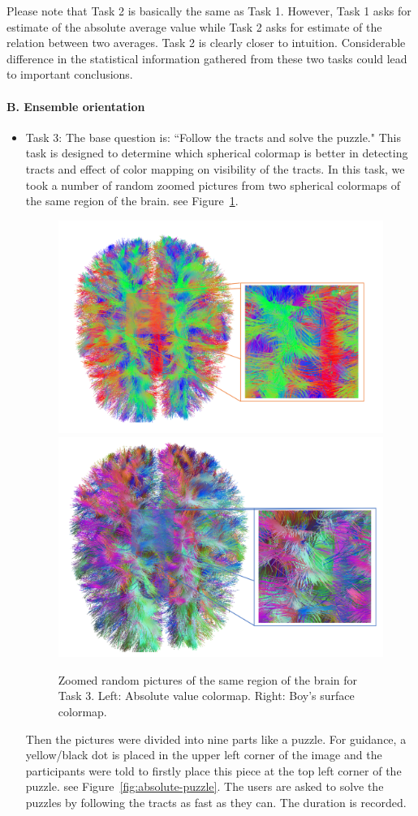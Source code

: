 \documentclass[a4paper, 12pt]{report}
\begin{document}
\begin{itemize}
	
Please note that Task 2 is basically the same as Task 1. However, Task 1 asks for estimate of the absolute average value  while Task 2 asks for estimate of the relation between two averages. Task 2 is clearly closer to intuition. Considerable difference in the statistical information gathered from these two tasks could lead to important conclusions.
	
\end{itemize}


\paragraph{B. Ensemble orientation}

\begin{itemize}
\item{Task 3:} The base question is: ``Follow the tracts and solve the puzzle."
This task is designed to determine which spherical colormap is better in detecting tracts and effect of color mapping on visibility of the tracts. In this task, we took a number of random zoomed pictures from two spherical colormaps of the same region of the brain. see Figure~\ref{fig:absolute-zoomed}.

\begin{figure}[ht]
    \centering
    \includegraphics[width = 0.49 \columnwidth]{absolute-zoomed}
    \includegraphics[width = 0.45 \columnwidth]{boy's-zoomed}
    \caption{Zoomed random pictures of the same region of the brain for Task 3. Left:  Absolute value colormap. Right: Boy's surface colormap.}
    \label{fig:absolute-zoomed}
\end{figure}

Then the pictures were divided into nine parts like a puzzle. For guidance, a yellow/black dot is placed in the upper left corner of the image and the participants were told to firstly place this piece at the top left corner of the puzzle. see Figure~\ref{fig:absolute-puzzle}. The users are asked to solve the puzzles by following the tracts as fast as they can. The duration is recorded. 


\end{itemize}
\end{document}
